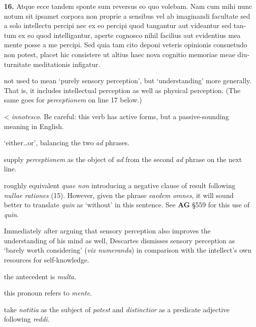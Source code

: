 \beginnumbering
\pstart
\begin{latin}
    \textenglish{\textbf{16.}} Atque ecce tandem sponte sum reversus eo quo volebam. Nam cum mihi nunc notum sit ipsamet corpora non proprie a sensibus vel ab imaginandi facultate sed a solo intellectu percipi nec ex eo percipi quod tangantur aut videantur sed tantum ex eo quod intelligantur, aperte cognosco nihil facilius aut evidentius mea mente posse a me percipi. Sed quia tam cito deponi veteris opinionis consuetudo non potest, placet hic consistere ut altius haec nova cognitio memoriae meae diuturnitate meditationis infigatur.
\end{latin}
\pend
\endnumbering

\prenotes

 not used to mean `purely sensory perception', but `understanding' more generally. That is, it includes intellectual perception as well as physical perception. (The same goes for \textit{perceptionem} on line 17 below.)

 < \textit{innotesco}. Be careful: this verb has active forms, but a passive-sounding meaning in English.

 `either\dots or', balancing the two \textit{ad} phrases.

 supply \textit{perceptionem} as the object of \textit{ad} from the second \textit{ad} phrase on the next line.

 roughly equivalent \textit{quae non} introducing a negative clause of result following \textit{nullae rationes} (15). However, given the phrase \textit{eaedem omnes}, it will sound better to translate \textit{quin} as `without' in this sentence. See \textbf{AG} §559 for this use of \textit{quin}.

 Immediately after arguing that sensory perception also improves the understanding of his mind as well, Descartes dismisses sensory perception as `barely worth considering' (\textit{vix numeranda}) in comparison with the intellect's own resources for self-knowledge.

 the antecedent is \textit{multa}.

 this pronoun refers to \textit{mente}.

 take \textit{notitia} as the subject of \textit{potest} and \textit{distinctior} as a predicate adjective following \textit{reddi}.

